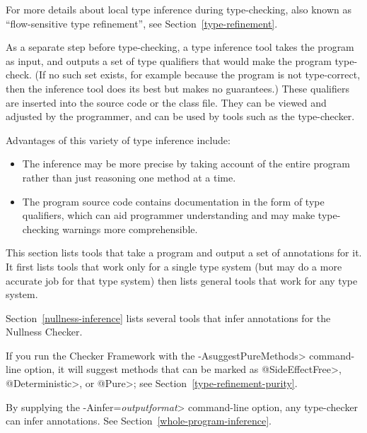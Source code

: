 For more details about local type inference during type-checking, also
known as ``flow-sensitive type refinement'', see
Section~\ref{type-refinement}.



As a separate step before type-checking, a type inference tool takes the
program as input, and outputs a set of type qualifiers that would
make the program type-check.  (If no such set exists, for example because
the program is not type-correct, then the inference tool does its best but
makes no guarantees.)
These qualifiers are inserted into the source code or the
class file.  They can be viewed and adjusted by the programmer, and can
be used by tools such as the type-checker.

Advantages of this variety of type inference include:
\begin{itemize}
\item
  The inference may be more precise by taking account of the entire program
  rather than just reasoning one method at a time.
\item
  The program source code contains documentation in the form of type
  qualifiers, which can aid programmer understanding and may make
  type-checking warnings more comprehensible.
\end{itemize}



This section lists tools that take a program and output a set of
annotations for it.
It first lists tools that work only for a single type system (but may do a
more accurate job for that type system)
then lists general tools that work for any type system.



Section~\ref{nullness-inference} lists several tools that infer
annotations for the Nullness Checker.

If you run the Checker Framework with the \<-AsuggestPureMethods>
command-line option, it will suggest methods that can be marked as
\<@SideEffectFree>, \<@Deterministic>, or \<@Pure>; see
Section~\ref{type-refinement-purity}.



By supplying the \<-Ainfer=\emph{outputformat}> command-line option,
any type-checker can infer annotations. See Section~\ref{whole-program-inference}.


